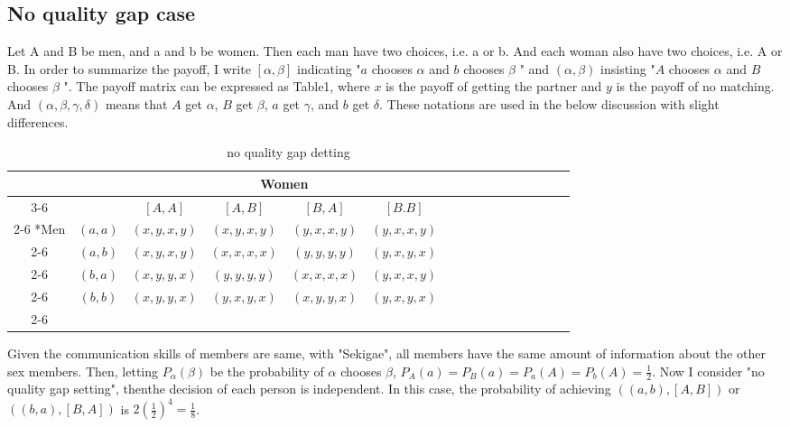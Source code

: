 \documentclass{article}
\begin{document}
	\subsection{No quality gap case}
	\par
	Let A and B be men, and a and b be women. Then each man have two choices, i.e. a or b. And each woman also have two choices, i.e. A or B. In order to summarize the payoff, I write $[\alpha, \beta]$ indicating "$a$ chooses $\alpha$ and $b$ chooses $\beta$ " and $(\alpha, \beta)$ insisting "$A$ chooses $\alpha$ and $B$ chooses $\beta$ ". The payoff matrix can be expressed as Table1, where $x$ is the payoff of getting the partner and $y$ is the payoff of no matching. And $(\alpha, \beta, \gamma, \delta)$ means that $A$ get $\alpha$, $B$ get $\beta$, $a$ get $\gamma$, and $b$ get $\delta$. These notations are used in the below discussion with slight differences.
	\begin{table}[h]
	\begin{center}
                \setlength{\extrarowheight}{2pt}
                \begin{tabular}{*{16}{c|}}
                  \multicolumn{2}{c}{} & \multicolumn{1}{c}{} & \multicolumn{2}{c}{Women}\\\cline{3-6}
                  \multicolumn{1}{c}{} &  & $[A, A]$  & $[A, B]$ & $[B, A]$ & $[B.B]$\\\cline{2-6}
                  \multirow{4}*{Men}  & $(a,a)$ & $(x,y,x,y)$ & $(x,y,x,y)$ & $(y,x,x,y)$ & $(y,x,x,y)$\\\cline{2-6}
                  & $(a,b)$ & $(x,y,x,y)$ & $(x,x,x,x)$ & $(y,y,y,y)$ & $(y,x,y,x)$\\\cline{2-6}
                  & $(b,a)$ & $(x,y,y,x)$ & $(y,y,y,y)$ & $(x,x,x,x)$ & $(y,x,x,y)$\\\cline{2-6}
                  & $(b,b)$ & $(x,y,y,x)$ & $(y,x,y,x)$ & $(x,y,y,x)$ & $(y,x,y,x)$\\\cline{2-6}
                \end{tabular}
        \end{center}
        \caption{no quality gap detting}
  	\end{table}
	\par
	Given the communication skills of members are same, with "Sekigae", all members have the same amount of information about the other sex members. Then, letting $P_\alpha(\beta)$ be the probability of $\alpha$ chooses $\beta$, $P_A(a)= P_B(a) = P_a(A) = P_b(A) = \frac{1}{2}$. Now I consider "no quality gap setting", thenthe decision of each person is independent. In this case, the probability of achieving $\left( (a, b), [A, B] \right)$ or $\left( (b, a), [B, A] \right)$ is $2 \left(\frac{1}{2}\right)^4 = \frac{1}{8}$.
\end{document}
